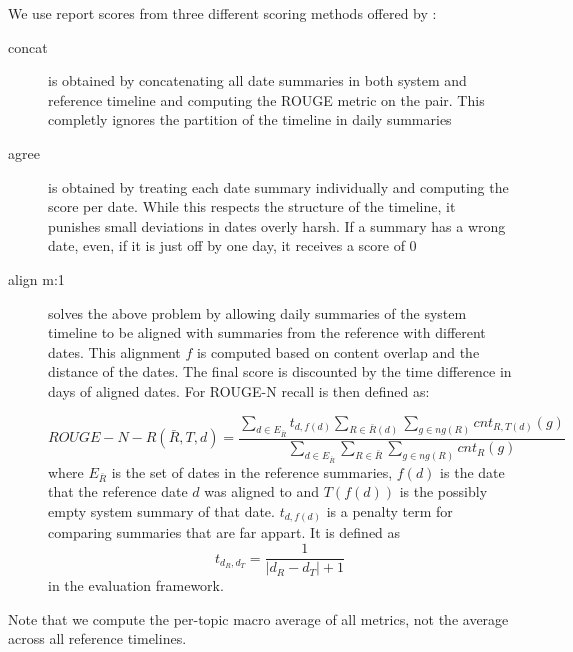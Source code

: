 \documentclass[a4paper,BCOR=10mm]{report}
\numberwithin{lemma}{chapter}
\numberwithin{definition}{chapter}
\begin{document}
We use report scores from three different scoring methods offered by \citet{tilse}:
\begin{description}
\item[concat] {is obtained by concatenating all date summaries in both system and reference timeline and computing the ROUGE metric on the pair.
This completly ignores the partition of the timeline in daily summaries}
\item[agree] {is obtained by treating each date summary individually and computing the score per date. While this respects the structure of the timeline, it punishes small deviations in dates overly harsh. If a summary has a wrong date, even, if it is just off by one day, it receives a score of $0$}
\item[align m:1] {solves the above problem by allowing daily summaries of the system timeline to be aligned with summaries from the reference with different dates. This alignment $f$ is computed based on content overlap and the distance of the dates.
The final score is discounted by the time difference in days of aligned dates. For ROUGE-N recall is then defined as:

\begin{equation}
    \mathit{ROUGE-N-R}(\bar{R}, T, d) =  \frac{
        \sum_{d \in E_{\bar{R}}} t_{d, f(d)}
        \sum_{R \in \bar{R}(d)}
        \sum_{g \in \mathit{ng}(R)}
        \mathit{cnt}_{R,T(d)}(g)
    }{
        \sum_{d \in E_{\bar{R}}}
        \sum_{R \in \bar{R}}
        \sum_{g \in \mathit{ng}(R)}
        \mathit{cnt}_R(g)
    }
\end{equation}
where $E_{\bar{R}}$ is the set of dates in the reference summaries,
$f(d)$ is the date that the reference date $d$ was aligned to and $T(f(d))$ is the possibly empty system summary of that date.
$t_{d,f(d)}$ is a penalty term for comparing summaries that are far appart.
It is defined as
\begin{equation}
t_{d_R, d_T} = \frac{1}{|d_R - d_T| + 1}
\end{equation}
in the evaluation framework.


 }
\end{description}


Note that we compute the per-topic macro average of all metrics, not the average across all reference timelines.
\end{document}

